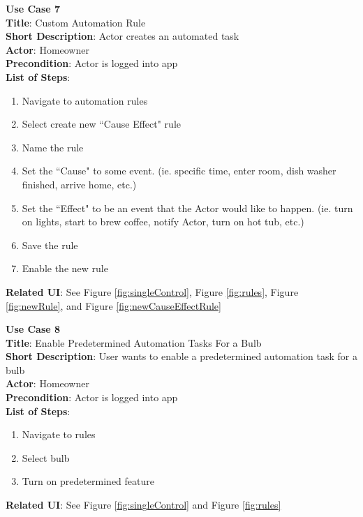 \documentclass[12pt]{article}
\begin{document}
\begin{samepage}
  \begin{framed}
    \textbf{Use Case 7} \\
    \textbf{Title}: Custom Automation Rule \\
    \textbf{Short Description}: Actor creates an automated task \\
    \textbf{Actor}: Homeowner \\
    \textbf{Precondition}: Actor is logged into app \\
    \textbf{List of Steps}:
    \begin{enumerate}
        \item Navigate to automation rules
        \item Select create new ``Cause Effect" rule
        \item Name the rule
        \item Set the ``Cause" to some event. (ie. specific time, enter room, dish washer finished, arrive home, etc.)
        \item Set the ``Effect" to be an event that the Actor would like to happen. (ie. turn on lights, start to brew coffee, notify Actor, turn on hot tub, etc.)
        \item Save the rule
        \item Enable the new rule
    \end{enumerate}
    \textbf{Related UI}:  See Figure \ref{fig:singleControl}, Figure \ref{fig:rules}, Figure \ref{fig:newRule}, and Figure \ref{fig:newCauseEffectRule}
  \end{framed}
\end{samepage}

\begin{samepage}
  \begin{framed}
    \textbf{Use Case 8}\\
    \textbf{Title}: Enable Predetermined Automation Tasks For a Bulb\\
    \textbf{Short Description}: User wants to enable a predetermined automation task for a bulb\\
    \textbf{Actor}: Homeowner \\
    \textbf{Precondition}: Actor is logged into app \\
    \textbf{List of Steps}:
    \begin{enumerate}
      \item Navigate to rules
      \item Select bulb
      \item Turn on predetermined feature
    \end{enumerate}
    \textbf{Related UI}:  See Figure \ref{fig:singleControl} and Figure \ref{fig:rules} 
  \end{framed}
\end{samepage}
\end{document}
